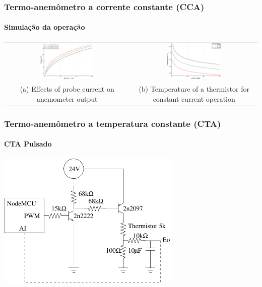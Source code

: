 \documentclass[12pt,handout]{beamer}
\begin{document}
\begin{frame}
  \frametitle{Termo-anemômetro a corrente constante (CCA)}
  \framesubtitle{Simulação da operação}
 \centering
  \begin{tabular}{cc}
    \includegraphics[width=0.45\textwidth]{../../figures/CCA-Eo.pdf} & 
    \includegraphics[width=0.45\textwidth]{../../figures/CCA-T.pdf} \\
    \parbox{0.4\textwidth}{\footnotesize (a) Effects of probe current on anemometer output} & \parbox{0.4\textwidth}{\footnotesize (b) Temperature of a thermistor for constant current operation}\\
  \end{tabular}
\end{frame}



\begin{frame}
  \frametitle{Termo-anemômetro a temperatura constante (CTA)}
  \framesubtitle{CTA Pulsado}
  \centering
  \includegraphics[width=0.66\textwidth]{../../figures/cta.pdf} 
  
\end{frame}
\end{document}
